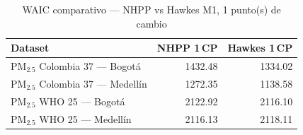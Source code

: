\begin{table}[htbp]
\centering
\caption{WAIC comparativo --- NHPP vs Hawkes M1, 1 punto(s) de cambio}
\label{tab:comp_waic_1cp}
\begin{tabular}{lrr}
\toprule
Dataset & NHPP 1\,CP & Hawkes 1\,CP \\
\midrule
PM$_{2.5}$ Colombia 37 --- Bogot\'{a} & 1432.48 & 1334.02 \\
PM$_{2.5}$ Colombia 37 --- Medell\'{i}n & 1272.35 & 1138.58 \\
PM$_{2.5}$ WHO 25 --- Bogot\'{a} & 2122.92 & 2116.10 \\
PM$_{2.5}$ WHO 25 --- Medell\'{i}n & 2116.13 & 2118.11 \\
\bottomrule
\end{tabular}
\end{table}
